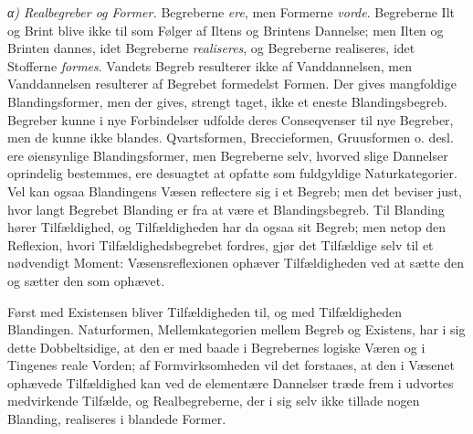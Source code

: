 \documentclass[12pt,a4paper]{book}
\newcommand{\subrunin}[1]{\emph{#1}\hspace{0.4em}}
\begin{document}
\subrunin{α) Realbegreber og Former.} Begreberne \emph{ere},
men Formerne \emph{vorde}. Begreberne Ilt og Brint blive ikke til som
Følger af Iltens og Brintens Dannelse; men Ilten og Brinten dannes, idet
Begreberne \emph{realiseres}, og Begreberne realiseres, idet Stofferne
\emph{formes}. Vandets Begreb resulterer ikke af Vanddannelsen, men
Vanddannelsen resulterer af Begrebet formedelst Formen. Der gives
mangfoldige Blandingsformer, men der gives, strengt taget, ikke et eneste
Blandingsbegreb. Begreber kunne i nye Forbindelser udfolde deres
Conseqvenser til nye Begreber, men de kunne ikke blandes. Qvartsformen,
Breccieformen, Gruusformen o. desl. ere øiensynlige Blandingsformer, men
Begreberne selv, hvorved slige Dannelser oprindelig bestemmes, ere
desuagtet at opfatte som fuldgyldige Naturkategorier. Vel kan ogsaa
Blandingens Væsen reflectere sig i et Begreb; men det beviser just, hvor
langt Begrebet Blanding er fra at være et Blandingsbegreb. Til Blanding
hører Tilfældighed, og Tilfældigheden har da ogsaa sit Begreb; men netop
den Reflexion, hvori Tilfældighedsbegrebet fordres, gjør det Tilfældige
selv til et nødvendigt Moment: Væsensreflexionen ophæver Tilfældigheden
ved at sætte den og sætter den som ophævet.

Først med Existensen bliver Tilfældigheden til, og med Tilfældigheden
Blandingen. Naturformen, Mellemkategorien mellem Begreb og Existens, har
i sig dette Dobbeltsidige, at den er med baade i Begrebernes logiske
Væren og i Tingenes reale Vorden; af Formvirksomheden vil det forstaaes,
at den i Væsenet ophævede Tilfældighed kan ved de elementære Dannelser
træde frem i udvortes medvirkende Tilfælde, og Realbegreberne, der i sig
selv ikke tillade nogen Blanding, realiseres i blandede Former.
\end{document}
